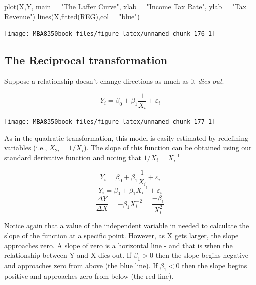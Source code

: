 \documentclass[
]{book}
\newenvironment{Shaded}{\begin{snugshade}}{\end{snugshade}}
\newcommand{\AttributeTok}[1]{\textcolor[rgb]{0.77,0.63,0.00}{#1}}
\newcommand{\FunctionTok}[1]{\textcolor[rgb]{0.00,0.00,0.00}{#1}}
\newcommand{\NormalTok}[1]{#1}
\newcommand{\StringTok}[1]{\textcolor[rgb]{0.31,0.60,0.02}{#1}}
\begin{document}
\begin{Shaded}
\begin{Highlighting}[]
\FunctionTok{plot}\NormalTok{(X,Y,}
     \AttributeTok{main =} \StringTok{"The Laffer Curve"}\NormalTok{,}
     \AttributeTok{xlab =} \StringTok{"Income Tax Rate"}\NormalTok{,}
     \AttributeTok{ylab =} \StringTok{"Tax Revenue"}\NormalTok{)}
\FunctionTok{lines}\NormalTok{(X,}\FunctionTok{fitted}\NormalTok{(REG),}\AttributeTok{col =} \StringTok{"blue"}\NormalTok{)}
\end{Highlighting}
\end{Shaded}

\begin{center}\texttt{[image: MBA8350book\_files/figure-latex/unnamed-chunk-176-1]} \end{center}

\hypertarget{the-reciprocal-transformation}{%
\subsection{The Reciprocal transformation}\label{the-reciprocal-transformation}}

Suppose a relationship doesn't change directions as much as it \emph{dies out}.

\[Y_i = \beta_0 + \beta_1 \frac{1}{X_i} + \varepsilon_i\]

\begin{center}\texttt{[image: MBA8350book\_files/figure-latex/unnamed-chunk-177-1]} \end{center}

As in the quadratic transformation, this model is easily estimated by redefining variables (i.e., \(X_{2i}=1/X_i\)). The slope of this function can be obtained using our standard derivative function and noting that \(1/X_i = X_i^{-1}\)

\[Y_i = \beta_0 + \beta_1 \frac{1}{X_i} + \varepsilon_i\]
\[Y_i = \beta_0 + \beta_1 X_i^{-1} + \varepsilon_i\]
\[\frac{\Delta Y}{\Delta X} = -\beta_1 X_i^{-2}=\frac{-\beta_1} {X_i^{2}}\]

Notice again that a value of the independent variable in needed to calculate the slope of the function at a specific point. However, as X gets larger, the slope approaches zero. A slope of zero is a horizontal line - and that is when the relationship between Y and X dies out. If \(\beta_1>0\) then the slope begins negative and approaches zero from above (the blue line). If \(\beta_1<0\) then the slope begins positive and approaches zero from below (the red line).
\end{document}
